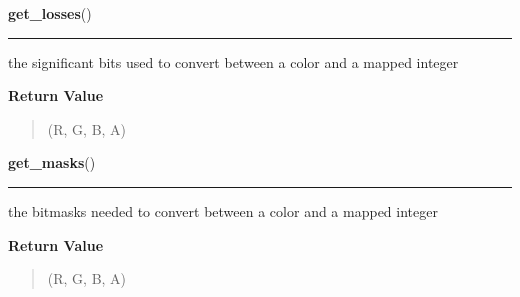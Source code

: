     \label{pygame:Surface:get_losses}

    \vspace{0.5ex}

\hspace{.8\funcindent}\begin{boxedminipage}{\funcwidth}

    \raggedright \textbf{get\_losses}()

    \vspace{-1.5ex}

    \rule{\textwidth}{0.5\fboxrule}
\setlength{\parskip}{2ex}
    the significant bits used to convert between a color and a mapped 
    integer

\setlength{\parskip}{1ex}
      \textbf{Return Value}
    \vspace{-1ex}

      \begin{quote}
      (R, G, B, A)

      \end{quote}

    \end{boxedminipage}

    \label{pygame:Surface:get_masks}

    \vspace{0.5ex}

\hspace{.8\funcindent}\begin{boxedminipage}{\funcwidth}

    \raggedright \textbf{get\_masks}()

    \vspace{-1.5ex}

    \rule{\textwidth}{0.5\fboxrule}
\setlength{\parskip}{2ex}
    the bitmasks needed to convert between a color and a mapped integer

\setlength{\parskip}{1ex}
      \textbf{Return Value}
    \vspace{-1ex}

      \begin{quote}
      (R, G, B, A)

      \end{quote}

    \end{boxedminipage}

    \label{pygame:Surface:get_offset}

